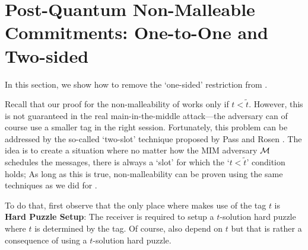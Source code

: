 
\section{Post-Quantum Non-Malleable Commitments: One-to-One and Two-sided}
\label{sec:two-sided:main-body}

In this section, we show how to remove the `one-sided' restriction from . 
 
Recall that our proof for the non-malleability of  works only if $t<\tilde{t}$. However, this is not guaranteed in the real main-in-the-middle attack---the adversary can of course use a smaller tag in the right session. Fortunately, this problem can be addressed by the so-called `two-slot' technique proposed by Pass and Rosen \cite{STOC:PasRos05}. The idea is to create a situation where no matter how the MIM adversary $\mathcal{M}$ schedules the messages, there is always a `slot' for which the `$t<\tilde{t}$' condition holds; As long as this is true, non-malleability can be proven using the same techniques as we did for .

To do that, first observe that the only place where  makes use of the tag $t$ is  {\bf Hard Puzzle Setup}: The receiver is required to setup a $t$-solution hard puzzle where $t$ is determined by the tag. Of course,  also depend on $t$ but that is rather a consequence of  using a $t$-solution hard puzzle. 


